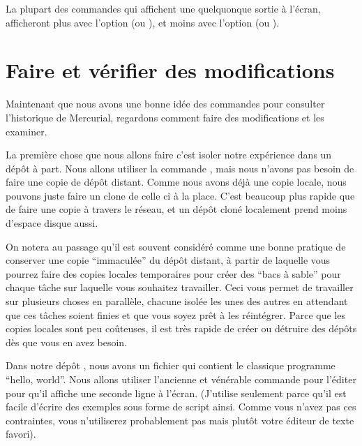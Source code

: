 La plupart des commandes qui affichent une quelquonque sortie à l'écran,
afficheront plus avec l'option  (ou ), et
moins avec l'option  (ou ).

\section{Faire et vérifier des modifications}

Maintenant que nous avons une bonne idée des commandes pour consulter 
l'historique de Mercurial, regardons comment faire des modifications et 
les examiner.


La première chose que nous allons faire c'est isoler notre expérience dans
un dépôt à part. Nous allons utiliser la commande , mais nous
n'avons pas besoin de faire une copie de dépôt distant. Comme nous avons 
déjà une copie locale, nous pouvons juste faire un clone de celle ci à la 
place. C'est beaucoup plus rapide que de faire une copie à travers le 
réseau, et un dépôt cloné localement prend moins d'espace disque aussi.


On notera au passage qu'il est souvent considéré comme une bonne pratique
de conserver une copie ``immaculée'' du dépôt distant, à partir de laquelle
vous pourrez faire des copies locales temporaires pour créer des ``bacs à 
sable'' pour chaque tâche sur laquelle vous souhaitez travailler. Ceci vous
permet de travailler sur plusieurs choses en parallèle, chacune isolée les 
unes des autres en attendant que ces tâches soient finies et que vous soyez
prêt à les réintégrer. Parce que les copies locales sont peu coûteuses, il
est très rapide de créer ou détruire des dépôts dès que vous en avez besoin.


Dans notre dépôt , nous avons un fichier 
qui contient le classique programme ``hello, world''. Nous allons utiliser 
l'ancienne et vénérable commande  pour l'éditer pour qu'il 
affiche une seconde ligne à l'écran. (J'utilise  seulement parce
qu'il est facile d'écrire des exemples sous forme de script ainsi. Comme 
vous n'avez pas ces contraintes, vous n'utiliserez probablement pas 
mais plutôt votre éditeur de texte favori). 

